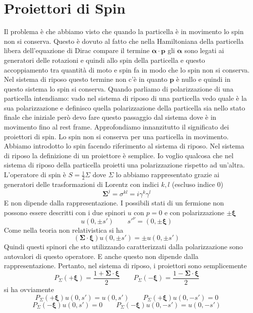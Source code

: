 \section{Proiettori di Spin}
Il problema è che abbiamo visto che quando la particella è in movimento lo spin non si conserva. Questo è dovuto al fatto che nella Hamiltoniana della particella libera dell'equazione di Dirac compare il termine $\boldsymbol{\alpha}\cdot\boldsymbol{p}$ gli $\boldsymbol{\alpha}$ sono legati ai generatori delle rotazioni e quindi allo spin della particella e questo accoppiamento tra quantità di moto e spin fa in modo che lo spin non si conserva. Nel sistema di riposo questo termine non c'è in quanto $\boldsymbol{p}$ è nullo e quindi in questo sistema lo spin si conserva. Quando parliamo di polarizzazione di una particella intendiamo: vado nel sistema di riposo di una particella vedo quale è la sua polarizzazione e definisco quella polarizzazione della particella sia nello stato finale che iniziale però devo fare questo passaggio dal sistema dove è in movimento fino al rest frame.
Approfondiamo innanzitutto il significato dei proiettori di spin. Lo spin non si conserva per una particella in movimento. Abbiamo introdotto lo spin facendo riferimento al sistema di riposo. Nel sistema di riposo la definizione di un proiettore è semplice. Io voglio qualcosa che nel sistema di riposo della particella proietti una polarizzazione rispetto ad un'altra. L'operatore di spin è $S=\frac{1}{2}\Sigma$ dove $\Sigma$ lo abbiamo rappresentato grazie ai generatori delle trasformazioni di Lorentz con indici $k,l$ (escluso indice $0$)
$$
\boldsymbol{\Sigma}^j = \sigma^{kl} = i\gamma^k\gamma^l
$$
E non dipende dalla rappresentazione. I possibili stati di un fermione non possono essere descritti con i due spinori $u$ con $p=0$ e con polarizzazione $\pm\boldsymbol{\xi}$
$$
u(0, \pm s') \qquad s'^\nu=(0,\pm\boldsymbol{\xi})
$$
Come nella teoria non relativistica si ha
$$
(\boldsymbol{\Sigma} \cdot \boldsymbol{\xi}) u(0, \pm s') = \pm u(0, \pm s')
$$
Quindi questi spinori che sto utilizzando caratterizzati dalla polarizzazione sono autovalori di questo operatore.
E anche questo non dipende dalla rappresentazione. Pertanto, nel sistema di riposo, i proiettori sono semplicemente
$$
P_\Sigma(+\boldsymbol{\xi}) = \frac{1 + \boldsymbol{\Sigma} \cdot \boldsymbol{\xi}}{2} \qquad P_\Sigma(-\boldsymbol{\xi}) = \frac{1 - \boldsymbol{\Sigma} \cdot \boldsymbol{\xi}}{2}
$$
si ha ovviamente
$$
P_\Sigma(+\boldsymbol{\xi}) u(0, s') = u(0, s') \qquad P_\Sigma(+\boldsymbol{\xi}) u(0, -s') = 0
$$
$$
P_\Sigma(-\boldsymbol{\xi}) u(0, s') = 0 \qquad P_\Sigma(-\boldsymbol{\xi}) u(0, -s') = u(0, -s')
$$
